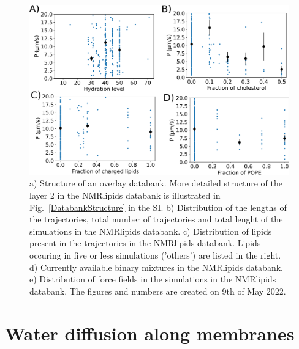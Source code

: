 \documentclass[fleqn,10pt]{wlscirep}
\begin{document}
\begin{figure}[!h]
    \centering
    \includegraphics[width = 180mm]{Figures/permeationSI.pdf}
    \caption{a) Structure of an overlay databank. 
    More detailed structure of the layer 2 in the NMRlipids databank is illustrated in Fig.~\ref{DatabankStructure} in the SI.
    b) Distribution of the lengths of the trajectories, total number of trajectories and total lenght of the simulations in the NMRlipids databank.
    c) Distribution of lipids present in the trajectories in the NMRlipids databank. Lipids occuring in five or less simulations ('others') are listed in the right. 
    d) Currently available binary mixtures in the NMRlipids databank. 
    e) Distribution of force fields in the simulations in the NMRlipids databank.
    The figures and numbers are created on 9th of May 2022.}
    \label{fig:permeationSI}
\end{figure}

\pagebreak
\section{Water diffusion along membranes}
\end{document}
